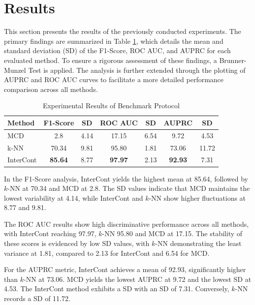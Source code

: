 \section{Results}\label{sec:results}
This section presents the results of the previously conducted experiments.
The primary findings are summarized in Table \ref{tab:results_bench}, which details the mean and standard deviation (SD) of the F1-Score, ROC AUC, and AUPRC for each evaluated method. 
To ensure a rigorous assessment of these findings, a Brunner-Munzel Test \citep{brunner2000nonparametric} is applied.
The analysis is further extended through the plotting of AUPRC and ROC AUC curves to facilitate a more detailed performance comparison across all methods.



\begin{table}[h]
\centering
\caption{Experimental Results of Benchmark Protocol}
\label{tab:results_bench}
\begin{tabular}{lcccccc} 
\toprule
\textbf{Method}         & \textbf{F1-Score} & \textbf{SD} & \textbf{ROC AUC} & \textbf{SD} & \textbf{AUPRC} & \textbf{SD}          \\
\midrule
MCD                     & 2.8               & 4.14  &  17.15            & 6.54     & 9.72              & 4.53   \\
k-NN                    & 70.34             & 9.81  &  95.80            & 1.81     & 73.06             & 11.72  \\
InterCont               & \textbf{85.64}    & 8.77  &  \textbf{97.97}   & 2.13     & \textbf{92.93}    & 7.31   \\
\bottomrule
\end{tabular}
\end{table}


In the F1-Score analysis, InterCont yields the highest mean at 85.64, followed by $k$-NN at 70.34 and MCD at 2.8. 
The SD values indicate that MCD maintains the lowest variability at 4.14, while InterCont and $k$-NN show higher fluctuations at 8.77 and 9.81.


The ROC AUC results show high discriminative performance across all methods, with InterCont reaching 97.97, $k$-NN 95.80 and MCD at 17.15. 
The stability of these scores is evidenced by low SD values, with $k$-NN demonstrating the least variance at 1.81, compared to 2.13 for InterCont and 6.54 for MCD.

\newpage
For the AUPRC metric, InterCont achieves a mean of 92.93, significantly higher than $k$-NN at 73.06.
MCD yields the lowest AUPRC at 9.72 and the lowest SD at 4.53. 
The InterCont method exhibits a SD with an SD of 7.31. 
Conversely, $k$-NN records a SD of 11.72. 


